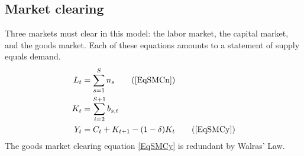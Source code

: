 \documentclass[letterpaper,12pt]{article}
\theoremstyle{definition}
\numberwithin{equation}{section}
\numberwithin{exercise}{section}
\begin{document}
\begin{spacing}{1.5}
   \subsection{Market clearing}\label{SecSperIntBeqMC}

      Three markets must clear in this model: the labor market, the capital market, and the goods market. Each of these equations amounts to a statement of supply equals demand.
      \begin{align}
         L_t &= \sum_{s=1}^S n_s \tag{\ref{EqSMCn}} \\
         K_t &= \sum_{i=2}^{S+1} b_{s,t} \label{EqIntBeqMCk} \\
         Y_t &= C_t + K_{t+1} - (1-\delta)K_t \tag{\ref{EqSMCy}}
      \end{align}
      The goods market clearing equation \eqref{EqSMCy} is redundant by Walras' Law.





\end{spacing}
\end{document}
